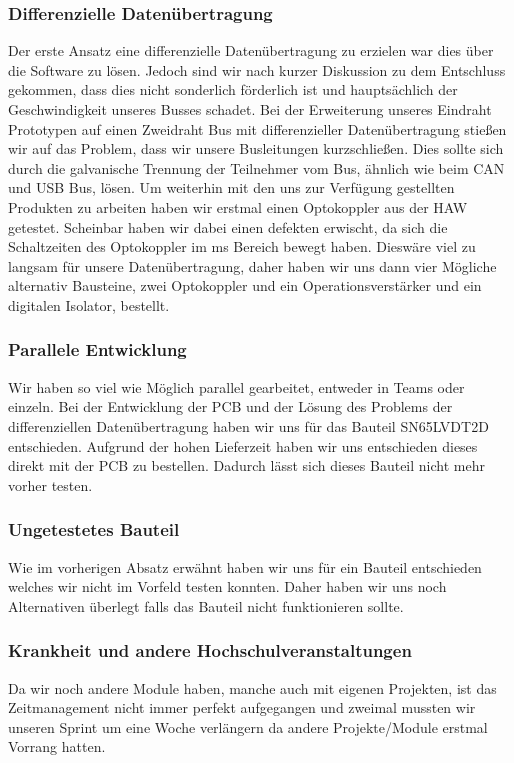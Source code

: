 \subsubsection{Differenzielle Datenübertragung}
Der erste Ansatz eine differenzielle Datenübertragung zu erzielen war dies über die Software zu lösen. Jedoch sind wir nach kurzer Diskussion zu dem Entschluss gekommen, dass dies nicht sonderlich förderlich ist und hauptsächlich der Geschwindigkeit unseres Busses schadet.
Bei der Erweiterung unseres Eindraht Prototypen auf einen Zweidraht Bus mit differenzieller Datenübertragung stießen wir auf das Problem, dass wir unsere Busleitungen kurzschließen. Dies sollte sich durch die galvanische Trennung der Teilnehmer vom Bus, ähnlich wie beim CAN und USB Bus, lösen.
Um weiterhin mit den uns zur Verfügung gestellten Produkten zu arbeiten haben wir erstmal einen Optokoppler aus der HAW getestet. Scheinbar haben wir dabei einen defekten erwischt, da sich die Schaltzeiten des Optokoppler im ms Bereich bewegt haben. Dieswäre viel zu langsam für unsere Datenübertragung, daher haben wir uns dann vier Mögliche alternativ Bausteine, zwei Optokoppler und ein Operationsverstärker und ein digitalen Isolator, bestellt. \\

\subsubsection{Parallele Entwicklung}
Wir haben so viel wie Möglich parallel gearbeitet, entweder in Teams oder einzeln. Bei der Entwicklung der PCB und der Lösung des Problems der differenziellen Datenübertragung haben wir uns für das Bauteil SN65LVDT2D entschieden. Aufgrund der hohen Lieferzeit haben wir uns entschieden dieses direkt mit der PCB zu bestellen. Dadurch lässt sich dieses Bauteil nicht mehr vorher testen.

\subsubsection{Ungetestetes Bauteil}
Wie im vorherigen Absatz erwähnt haben wir uns für ein Bauteil entschieden welches wir nicht im Vorfeld testen konnten. Daher haben wir uns noch Alternativen überlegt falls das Bauteil nicht funktionieren sollte. %

\subsubsection{Krankheit und andere Hochschulveranstaltungen}
Da wir noch andere Module haben, manche auch mit eigenen Projekten, ist das Zeitmanagement nicht immer perfekt aufgegangen und zweimal mussten wir unseren Sprint um eine Woche verlängern da andere Projekte/Module erstmal Vorrang hatten.

